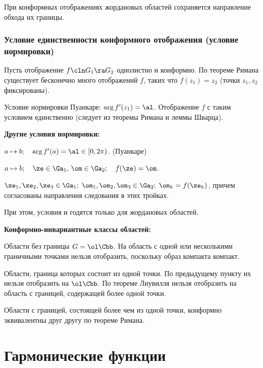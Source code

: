 \documentclass[a4paper]{article}
\begin{document}
\begin{theorem}
\begin{imp}
При конформных отображениях жордановых областей сохраняется направление обхода их границы.
\end{imp}

\subsubsection{Условие единственности конформного отображения (условие нормировки)}

Пусть отображение $f\cln G_1\ra G_2$ однолистно и конформно. По теореме
Римана существует бесконечно много отображений $f$,  таких что
$f(z_1)=z_2$ (точки $z_1, z_2$ фиксированы).

Условие нормировки Пуанкаре: $\arg f'(z_1)=\al$.
Отображение $f$ с таким условием единственно (следует из теоремы Римана и леммы Шварца).

\textbf{Другие условия нормировки:}

\begin{points}{-1}
\item $a\mapsto b; \quad \arg f'(a)=\al\in[0,2\pi)$. (Пуанкаре)
\item $a\mapsto b; \quad \ze\in\Ga_1, \, \om\in\Ga_2; \quad f(\ze)=\om$.
\item $\ze_1, \ze_2, \ze_3\in\Ga_1;\; \om_1, \om_2, \om_3\in\Ga_2;\;\om_k=f(\ze_k)$,
причем согласованы направления следования в этих тройках.
\end{points}

При этом, условия  и  годятся только для жордановых областей.

\textbf{Конформно-инвариантные классы областей:}

\begin{points}{-1}
\item Области без границы $G=\ol\Cbb$. На область с одной или несколькими граничными точками нельзя отобразить,
поскольку образ компакта компакт.
\item Области, граница которых состоит из одной точки.
По предыдущему пункту их нельзя отобразить на $\ol\Cbb$. По теореме Лиувилля нельзя
отобразить на область с границей, содержащей более одной точки.
\item Области с границей, состоящей более чем из одной точки, конформно эквивалентны друг другу по теореме Римана.
\end{points}

\section{Гармонические функции}


\end{theorem}
\end{document}

